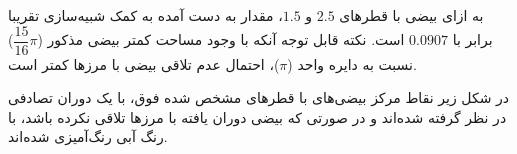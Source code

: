 \documentclass{scribe-cgenomics}
\begin{document}
\begin{حل}
به ازای بیضی با قطرهای
$2.5$
و
$1.5$، مقدار به دست آمده به کمک شبیه‌سازی تقریبا برابر با
$0.0907$
است. نکته قابل توجه آنکه با وجود مساحت کمتر بیضی مذکور ($
\dfrac{15}{16} \pi
$)
 نسبت به دایره واحد ($
\pi
$)،
احتمال عدم تلاقی بیضی با مرز‌ها کمتر است.

در شکل زیر نقاط مرکز بیضی‌های با قطرهای مشخص شده فوق، با یک دوران تصادفی در نظر گرفته شده‌اند و در صورتی که بیضی دوران یافته با مرزها تلاقی نکرده باشد، با رنگ آبی رنگ‌آمیزی شده‌اند.

\begin{figure}[h]
\label{6}
\centering
\end{figure}

\end{حل}


\newpage
\begin{prob}
\end{prob}

\begin{حل}
\end{حل}


\newpage
\begin{prob}
\end{prob}
\end{document}

